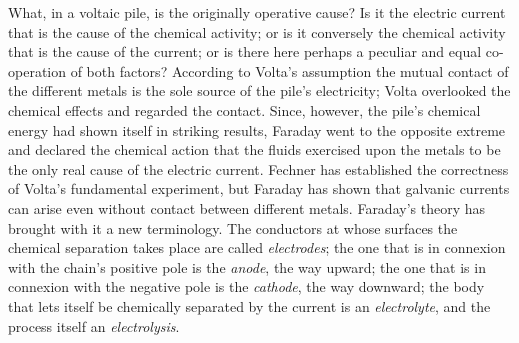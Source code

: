 \documentclass[12pt,a4paper]{book}
\begin{document}
What, in a voltaic pile, is the originally operative cause? Is it the electric current that is the cause of the chemical
activity; or is it conversely the chemical activity that is the cause of the current; or is there here
perhaps a peculiar and equal co-operation of both factors? According to Volta's assumption the mutual contact of the
different metals is the sole source of the pile's electricity; Volta overlooked the chemical effects and regarded the
contact. Since, however, the pile's chemical energy had shown itself in striking results, Faraday went to the opposite
extreme and declared the chemical action that the fluids exercised upon the metals to be the only real cause of the
electric current. Fechner has established the correctness of Volta's fundamental experiment, but Faraday has shown that
galvanic currents can arise even without contact between different metals. Faraday's theory has brought with it a new
terminology. The conductors at whose surfaces the chemical separation takes place are called
\emph{electrodes}; the one that is in connexion with the chain's positive pole is the \emph{anode}, the way upward; the
one that is in connexion with the negative pole is the \emph{cathode}, the way downward; the body that lets itself be
chemically separated by the current is an \emph{electrolyte}, and the process itself an \emph{electrolysis}.
\end{document}
